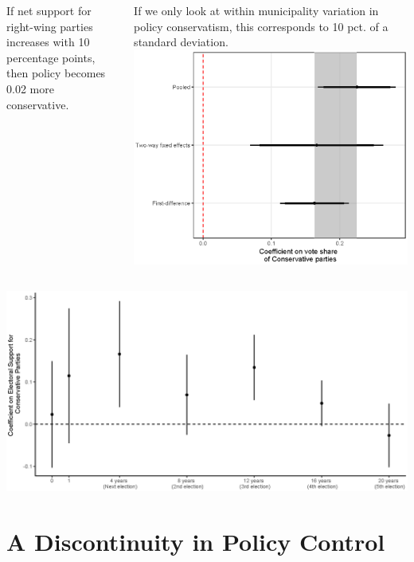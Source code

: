 \documentclass[10pt,aspectratio=169]{beamer}
\begin{document}
\begin{frame}	
\begin{columns}
If net support for right-wing parties increases with 10 percentage points, then policy becomes 0.02 more conservative. 

\vspace{0.2in}
If we only look at within municipality variation in policy conservatism, this corresponds to 10 pct. of a standard deviation. 
\includegraphics[width=1\textwidth]{images/Newest_ggplot_coef.eps}

\end{columns}
\end{frame}

\begin{frame}			
\includegraphics[width=1\textwidth]{images/NoLag_varying_leads.eps}
\end{frame}
	\section[Policy Control]{A Discontinuity in Policy Control}
	
\end{document}
